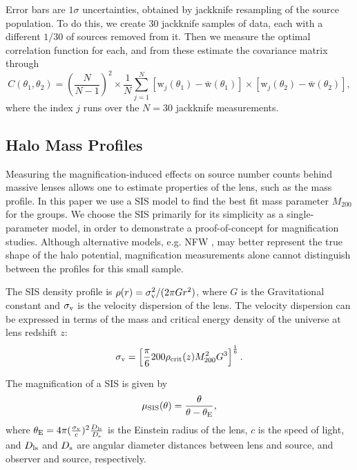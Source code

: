 Error bars are $1 \sigma$ uncertainties, obtained by jackknife resampling of the source population.  To do this, we create 30 jackknife samples of data, each with a different $1/30$ of sources removed from it.  Then we measure the optimal correlation function for each, and from these estimate the covariance matrix through
\begin{equation}
C(\theta_1, \theta_2)= \left( \frac{N}{N-1} \right)^2 \times \frac{1}{N} \sum_{j=1}^N [\mathrm{w}_j(\theta_1)-\bar{\mathrm{w}}(\theta_1)] \times [\mathrm{w}_j(\theta_2)-\bar{\mathrm{w}}(\theta_2)],
\end{equation}
where the index $j$ runs over the $N=30$ jackknife measurements.

\subsection{Halo Mass Profiles}
Measuring the magnification-induced effects on source number counts behind massive lenses allows one to estimate properties of the lens, such as the mass profile.  In this paper we use a \ac{SIS} model to find the best fit mass parameter $M_{200}$ for the groups. We choose the \ac{SIS} primarily for its simplicity as a single-parameter model, in order to demonstrate a proof-of-concept for magnification studies.  Although alternative models, e.g. \acf{NFW} \citep{nfw97}, may better represent the true shape of the halo potential, magnification measurements alone cannot distinguish between the profiles for this small sample.

The \ac{SIS} density profile is $\rho(r)=\sigma_{\rm v}^2/(2 \pi G r^2)$, where $G$ is the Gravitational constant and $\sigma_{\rm v}$ is the velocity dispersion of the lens.  The velocity dispersion can be expressed in terms of the mass and critical energy density of the universe at lens redshift $z$:
\begin{equation}
\sigma_{\rm v} =\left[ \frac{\pi}{6}200\rho_{\rm crit}(z)M_{200}^2 G^3 \right]^\frac{1}{6} .
\end{equation}

The magnification of a \ac{SIS} is given by 
\begin{equation}
\mu_{\rm SIS}(\theta)=\frac{\theta}{\theta-\theta_{\rm E}},
\end{equation}
where $\theta_{\rm E}=4\pi(\frac{\sigma_{\rm v}}{c})^2\frac{D_{\rm ls}}{D_{\rm s}}$ is the Einstein radius of the lens, $c$ is the speed of light, and $D_{\rm ls}$ and $D_{\rm s}$ are angular diameter distances between lens and source, and observer and source, respectively.


